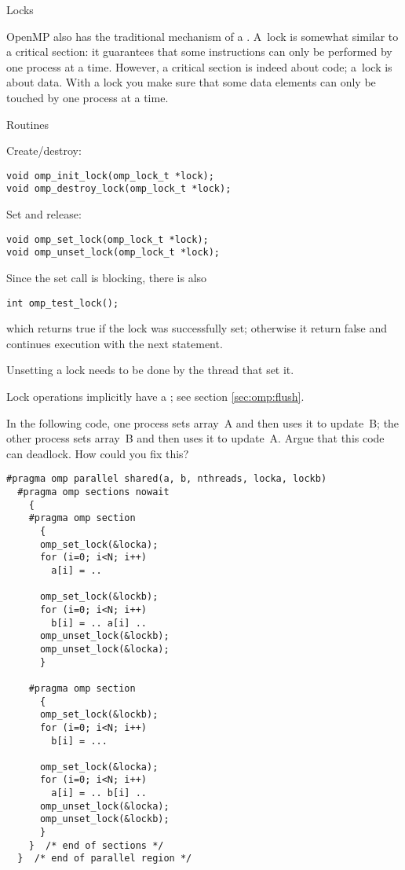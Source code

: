 
 {Locks}
\label{sec:ompref:locks}

OpenMP also has the traditional mechanism of a . A~lock is somewhat similar to 
a critical section: it guarantees that some instructions can only be performed by one
process at a time. However, a critical section is indeed about code; a~lock is about data.
With a lock you make sure that some data elements can only be touched by one process at a time.

 {Routines}

Create/destroy:
\begin{lstlisting}
void omp_init_lock(omp_lock_t *lock);
void omp_destroy_lock(omp_lock_t *lock);
\end{lstlisting}
Set and release:
\begin{lstlisting}
void omp_set_lock(omp_lock_t *lock);
void omp_unset_lock(omp_lock_t *lock);
\end{lstlisting}
Since the set call is blocking, there is also 
\begin{lstlisting}
int omp_test_lock();
\end{lstlisting}
which returns true if the lock was successfully set;
otherwise it return false and continues execution with the next statement.

Unsetting a lock needs to be done by the thread that set it.

Lock operations implicitly have a ;
see section \ref{sec:omp:flush}.

\begin{exercise}
  \label{ex:loc-deadlock}
  In the following code, one process sets array~A and then uses it to
  update~B; the other process sets array~B and then uses it to
  update~A.
  Argue that this code can deadlock. How could you fix this?
\begin{lstlisting}
#pragma omp parallel shared(a, b, nthreads, locka, lockb)
  #pragma omp sections nowait
    {
    #pragma omp section
      {
      omp_set_lock(&locka);
      for (i=0; i<N; i++)
        a[i] = ..

      omp_set_lock(&lockb);
      for (i=0; i<N; i++)
        b[i] = .. a[i] ..
      omp_unset_lock(&lockb);
      omp_unset_lock(&locka);
      }

    #pragma omp section
      {
      omp_set_lock(&lockb);
      for (i=0; i<N; i++)
        b[i] = ...

      omp_set_lock(&locka);
      for (i=0; i<N; i++)
        a[i] = .. b[i] ..
      omp_unset_lock(&locka);
      omp_unset_lock(&lockb);
      }
    }  /* end of sections */
  }  /* end of parallel region */
\end{lstlisting}
\end{exercise}

